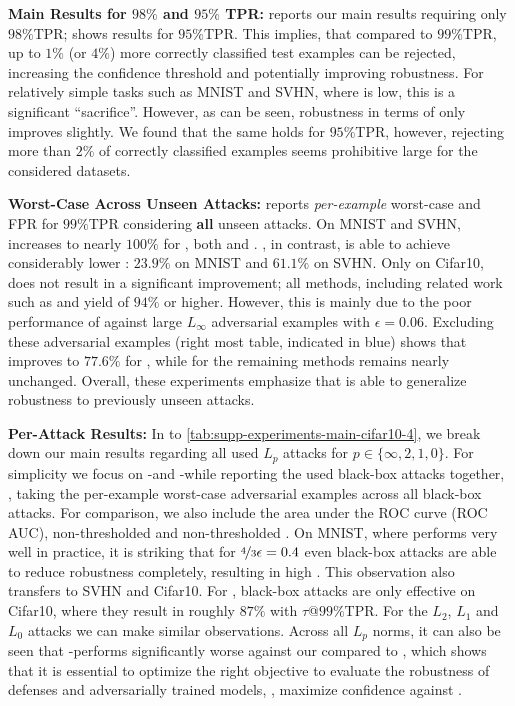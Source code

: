 \textbf{Main Results for $98\%$ and $95\%$ TPR:}
%
 reports our main results requiring only $98\%$TPR;  shows results for $95\%$TPR. This implies, that compared to $99\%$TPR, up to $1\%$ (or $4\%$) more correctly classified test examples can be rejected, increasing the confidence threshold and potentially improving robustness. For relatively simple tasks such as MNIST and SVHN, where \TE is low, this is a significant ``sacrifice''. However, as can be seen, robustness in terms of \RTE only improves slightly. We found that the same holds for $95\%$TPR, however, rejecting more than $2\%$ of correctly classified examples seems prohibitive large for the considered datasets.

\textbf{Worst-Case Across \textbf{\textcolor{colorbrewer1}{Unseen}} Attacks:}
%
 reports \emph{per-example} worst-case \RTE and FPR for $99\%$TPR considering \textbf{all} \textcolor{colorbrewer1}{unseen} attacks. On MNIST and SVHN, \RTE increases to nearly $100\%$ for \AdvTrain, both \AdvTrainHalf and \AdvTrainFull. \ConfTrain, in contrast, is able to achieve considerably lower \RTE: $23.9\%$ on MNIST and $61.1\%$ on SVHN. Only on Cifar10, \ConfTrain does not result in a significant improvement; all methods, including related work such as \Wong and \TRADES yield \RTE of $94\%$ or higher. However, this is mainly due to the poor performance of \ConfTrain against large $L_\infty$ adversarial examples with $\epsilon = 0.06$. Excluding these adversarial examples (right most table, indicated in \textcolor{colorbrewer2}{blue}) shows that \RTE improves to $77.6\%$ for \ConfTrain, while \RTE for the remaining methods remains nearly unchanged. Overall, these experiments emphasize that \ConfTrain is able to generalize robustness to previously unseen attacks.

\textbf{Per-Attack Results:}
%
In  to \ref{tab:supp-experiments-main-cifar10-4}, we break down our main results regarding all used $L_p$ attacks for $p \in \{\infty, 2, 1, 0\}$. For simplicity we focus on \PGD-\FCE and \PGD-\FConf while reporting the used black-box attacks together, \ie, taking the per-example worst-case adversarial examples across all black-box attacks. For comparison, we also include the area under the ROC curve (ROC AUC), non-thresholded \TE and non-thresholded \RTE. On MNIST, where \AdvTrain performs very well in practice, it is striking that for $\nicefrac{4}{3}\epsilon = 0.4$ even black-box attacks are able to reduce robustness completely, resulting in high \RTE. This observation also transfers to SVHN and Cifar10. For \ConfTrain, black-box attacks are only effective on Cifar10, where they result in roughly $87\%$ \RTE with $\tau$@$99\%$TPR. For the $L_2$, $L_1$ and $L_0$ attacks we can make similar observations. Across all $L_p$ norms, it can also be seen that \PGD-\FCE performs significantly worse against our \ConfTrain compared to \AdvTrain, which shows that it is essential to optimize the right objective to evaluate the robustness of defenses and adversarially trained models, \ie, maximize confidence against \ConfTrain.

